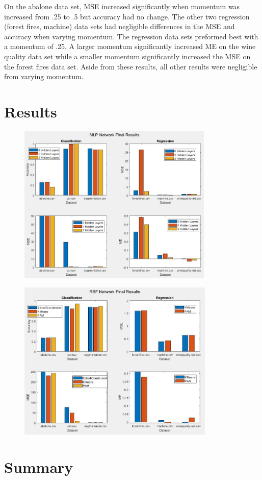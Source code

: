\documentclass[twoside,11pt]{article}
\begin{document}
On the abalone data set, MSE increased significantly when momentum was increased from .25 to .5 but accuracy had no change. The other two regression (forest fires, machine) data sets had negligible differences in the MSE and accuracy when varying momentum. The regression data sets preformed best with a momentum of .25. A larger momentum significantly increased ME on the wine quality data set while a smaller momentum significantly increased the MSE on the forest fires data set. Aside from these results, all other results were negligible from varying momentum.
\section{Results}
\begin{figure}[h]
	\centering
	\includegraphics[height=3in]{FINAL_FIGS/MLP_FINAL.JPG}
\end{figure}
\begin{figure}[h]
	\centering
	\includegraphics[height=3in]{FINAL_FIGS/RBF_FINAL.JPG}
\end{figure}
\section{Summary}



\end{document}
